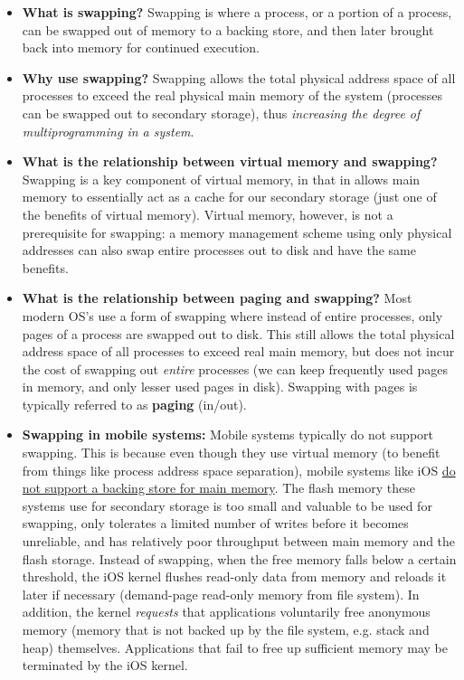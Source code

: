 \documentclass[12pt]{article}
\begin{document}
\begin{itemize}
    \item \textbf{What is swapping?} Swapping is where a process, or a portion of a process, can be swapped out of memory to a backing store, and then later brought back into memory for continued execution.
    \item \textbf{Why use swapping?} Swapping allows the total physical address space of all processes to exceed the real physical main memory of the system (processes can be swapped out to secondary storage), thus \textit{increasing the degree of multiprogramming in a system}.
    \item \textbf{What is the relationship between virtual memory and swapping?} Swapping is a key component of virtual memory, in that in allows main memory to essentially act as a cache for our secondary storage (just one of the benefits of virtual memory). Virtual memory, however, is not a prerequisite for swapping: a memory management scheme using only physical addresses can also swap entire processes out to disk and have the same benefits.
    \item \textbf{What is the relationship between paging and swapping?} Most modern OS's use a form of swapping where instead of entire processes, only pages of a process are swapped out to disk. This still allows the total physical address space of all processes to exceed real main memory, but does not incur the cost of swapping out \textit{entire} processes (we can keep frequently used pages in memory, and only lesser used pages in disk). Swapping with pages is typically referred to as \textbf{paging} (in/out).
    \item \textbf{Swapping in mobile systems:} Mobile systems typically do not support swapping. This is because even though they use virtual memory (to benefit from things like process address space separation), mobile systems like iOS \href{https://developer.apple.com/library/archive/documentation/Performance/Conceptual/ManagingMemory/Articles/AboutMemory.html}{do not support a backing store for main memory}. The flash memory these systems use for secondary storage is too small and valuable to be used for swapping, only tolerates a limited number of writes before it becomes unreliable, and has relatively poor throughput between main memory and the flash storage. Instead of swapping, when the free memory falls below a certain threshold, the iOS kernel flushes read-only data from memory and reloads it later if necessary (demand-page read-only memory from file system). In addition, the kernel \textit{requests} that applications voluntarily free anonymous memory (memory that is not backed up by the file system, e.g. stack and heap) themselves. Applications that fail to free up sufficient memory may be terminated by the iOS kernel.

\end{itemize}
\end{document}

